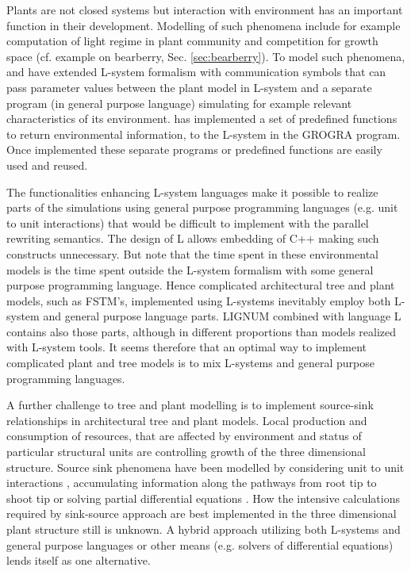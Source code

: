 Plants are not closed systems  but interaction with environment has an
important function in their  development.  Modelling of such phenomena
include for example computation of light regime in plant community and
competition  for  growth  space   (cf.   example  on  bearberry,  Sec.
\ref{sec:bearberry}).   To model  such phenomena,  \citet{mech:97} and
\citet{mech:96}  have extended  L-system formalism  with communication
symbols  that can  pass parameter  values between  the plant  model in
L-system  and  a  separate   program  (in  general  purpose  language)
simulating  for example relevant  characteristics of  its environment.
\citet{kurth:94}  has implemented  a  set of  predefined functions  to
return  environmental  information,  to  the L-system  in  the  GROGRA
program.   Once  implemented  these  separate programs  or  predefined
functions are  easily used  and reused. 

The functionalities  enhancing L-system languages make  it possible to
realize  parts of  the simulations  using general  purpose programming
languages (e.g.  unit to unit interactions) that would be difficult to
implement  with the  parallel rewriting  semantics.  The  design  of L
allows embedding of C++  making such constructs unnecessary.  But note
that the  time spent in these  environmental models is  the time spent
outside the  L-system formalism with some  general purpose programming
language.  Hence complicated architectural tree and plant models, such
as FSTM's, implemented using L-systems inevitably employ both L-system
and general  purpose language parts.  LIGNUM combined  with language L
contains  also those  parts,  although in  different proportions  than
models  realized with  L-system  tools.  It  seems  therefore that  an
optimal way to  implement complicated plant and tree  models is to mix
L-systems and general purpose programming languages.
 
A  further challenge  to  tree  and plant  modelling  is to  implement
source-sink  relationships  in architectural  tree  and plant  models.
Local production  and consumption of  resources, that are  affected by
environment and status of  particular structural units are controlling
growth of the three  dimensional structure. Source sink phenomena have
been   modelled    by   considering   unit    to   unit   interactions
\citep{balandier:00}, accumulating information along the pathways from
root  tip   to  shoot  tip  \citep{dereffye:97}   or  solving  partial
differential  equations  \citep{deleuze:97,  palovaara:03}.   How  the
intensive  calculations  required  by  sink-source approach  are  best
implemented in the three dimensional plant structure still is unknown.
A  hybrid  approach  utilizing  both  L-systems  and  general  purpose
languages  or other  means (e.g.   solvers of  differential equations)
lends itself as one alternative.

